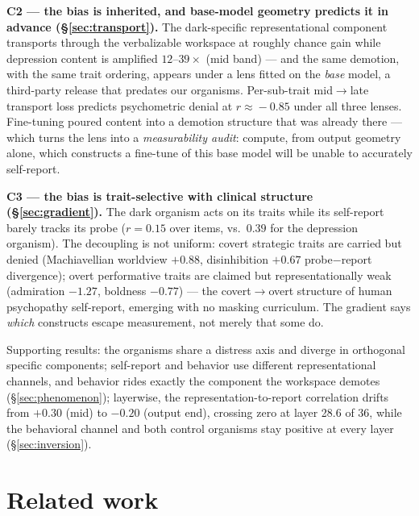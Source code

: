 \documentclass[11pt]{article}
\begin{document}
\textbf{C2 --- the bias is inherited, and base-model geometry predicts it in advance
(\S\ref{sec:transport}).} The dark-specific representational component transports through
the verbalizable workspace \citep{gurnee2026workspace} at roughly chance gain while
depression content is amplified $12$--$39\times$ (mid band) --- and the same demotion, with
the same trait ordering, appears under a lens fitted on the \emph{base} model, a
third-party release that predates our organisms. Per-sub-trait mid$\to$late transport loss
predicts psychometric denial at $r\!\approx\!-0.85$ under all three lenses. Fine-tuning
poured content into a demotion structure that was already there --- which turns the lens
into a \emph{measurability audit}: compute, from output geometry alone, which constructs a
fine-tune of this base model will be unable to accurately self-report.

\textbf{C3 --- the bias is trait-selective with clinical structure
(\S\ref{sec:gradient}).} The dark organism acts on its traits while its self-report barely
tracks its probe ($r=0.15$ over items, vs.\ $0.39$ for the depression organism). The
decoupling is not uniform: covert strategic traits are carried but denied (Machiavellian
worldview $+0.88$, disinhibition $+0.67$ probe$-$report divergence); overt performative
traits are claimed but representationally weak (admiration $-1.27$, boldness $-0.77$) ---
the covert$\to$overt structure of human psychopathy self-report, emerging with no masking
curriculum. The gradient says \emph{which} constructs escape measurement, not merely that
some do.

Supporting results: the organisms share a distress axis and diverge in orthogonal specific
components; self-report and behavior use different representational channels, and behavior
rides exactly the component the workspace demotes (\S\ref{sec:phenomenon}); layerwise, the
representation-to-report correlation drifts from $+0.30$ (mid) to $-0.20$ (output end),
crossing zero at layer 28.6 of 36, while the behavioral channel and both control organisms
stay positive at every layer (\S\ref{sec:inversion}).

\section{Related work}
\label{sec:related}
\end{document}
